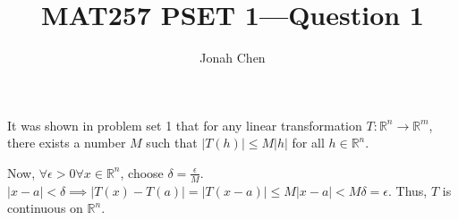 \documentclass{exam}
\title{MAT257 PSET 1---Question 1}
\author{Jonah Chen}
\numberwithin{equation}{section}
\newcommand{\R}{\mathbb{R}}
\begin{document}
    \sffamily
    It was shown in problem set 1 that for any linear transformation $T:\R^n\to\R^m$, there exists a number $M$ such that $|T(h)|\leq M|h|$ for all $h\in\R^n$. 

    Now, $\forall\epsilon>0\forall x\in\R^n$, choose $\delta=\frac{\epsilon}{M}$. $|x-a|<\delta\implies|T(x)-T(a)|=|T(x-a)|\leq M|x-a|<M\delta=\epsilon$. Thus, $T$ is continuous on $\R^n$.
\end{document}
